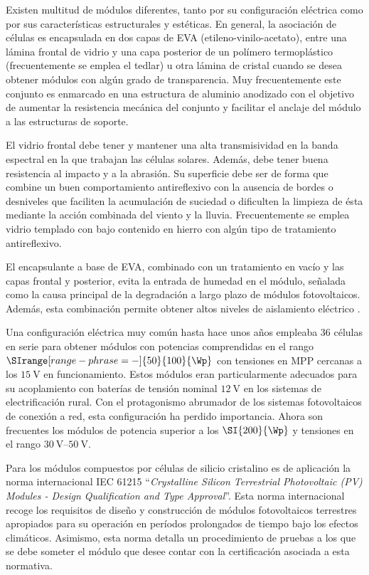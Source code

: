 Existen multitud de módulos diferentes, tanto por su configuración
eléctrica como por sus características estructurales y estéticas.
En general, la asociación de células es encapsulada en dos capas de
EVA (etileno-vinilo-acetato), entre una lámina frontal de vidrio y
una capa posterior de un polímero termoplástico (frecuentemente se
emplea el tedlar) u otra lámina de cristal cuando se desea obtener
módulos con algún grado de transparencia. Muy frecuentemente este
conjunto es enmarcado en una estructura de aluminio anodizado con
el objetivo de aumentar la resistencia mecánica del conjunto y facilitar
el anclaje del módulo a las estructuras de soporte.

El vidrio frontal debe tener y mantener una alta transmisividad en
la banda espectral en la que trabajan las células solares. Además,
debe tener buena resistencia al impacto y a la abrasión. Su superficie
debe ser de forma que combine un buen comportamiento antireflexivo
con la ausencia de bordes o desniveles que faciliten la acumulación
de suciedad o dificulten la limpieza de ésta mediante la acción combinada
del viento y la lluvia. Frecuentemente se emplea vidrio templado con
bajo contenido en hierro con algún tipo de tratamiento antireflexivo.

El encapsulante a base de EVA, combinado con un tratamiento en vacío
y las capas frontal y posterior, evita la entrada de humedad en el
módulo, señalada como la causa principal de la degradación a largo
plazo de módulos fotovoltaicos. Además, esta combinación permite obtener
altos niveles de aislamiento eléctrico \citep{Wenham.Green.ea2000}. 

Una configuración eléctrica muy común hasta hace unos años empleaba
36 células en serie para obtener módulos con potencias comprendidas
en el rango $\SIrange[range-phrase=-]{50}{100}{\Wp}$ con tensiones
en MPP cercanas a los $\SI{15}{\volt}$ en funcionamiento. Estos módulos
eran particularmente adecuados para su acoplamiento con baterías de
tensión nominal $\SI{12}{\volt}$ en los sistemas de electrificación
rural. Con el protagonismo abrumador de los sistemas fotovoltaicos
de conexión a red, esta configuración ha perdido importancia. Ahora
son frecuentes los módulos de potencia superior a los $\SI{200}{\Wp}$
y tensiones en el rango $\SIrange[range-phrase=-]{30}{50}{\volt}$.

Para los módulos compuestos por células de silicio cristalino es de
aplicación la norma internacional IEC 61215 {}``\emph{Crystalline
Silicon Terrestrial Photovoltaic (PV) Modules - Design Qualification
and Type Approval}''. Esta norma internacional recoge los requisitos
de diseño y construcción de módulos fotovoltaicos terrestres apropiados
para su operación en períodos prolongados de tiempo bajo los efectos
climáticos. Asimismo, esta norma detalla un procedimiento de pruebas
a los que se debe someter el módulo que desee contar con la certificación
asociada a esta normativa.


